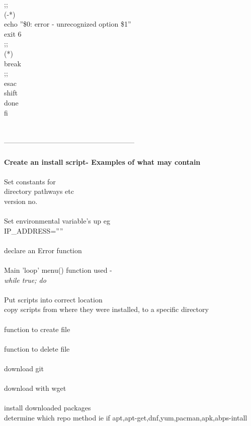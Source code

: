 \documentclass[10pt,a4paper]{article}
\begin{document}
{{{{{{{{{{{{{{{{{{{      ;;\\
      (-*)         \\
        echo ''\$0: error - unrecognized option \$1''\\
        exit 6\\
      ;;\\
      (*) \\
        break\\
      ;;\\
    esac\\
    shift\\
  done\\
fi\\
\\
\\
--------------------------------------------------------\\
\\
\textbf{Create an install script}\textbf{- Examples of what may contain}\\
\\
Set constants for \\
	directory pathways etc\\
	version no.\\
	\\
Set environmental variable's up eg\\
	IP\_ADDRESS=''''\\
\\
declare an Error function\\
\\
Main 'loop' menu() function used - \\
	\textit{while true; do}\\
\\
Put scripts into correct location\\
copy scripts from where they were installed, to a specific directory\\
\\
function to create file\\
\\
function to delete file\\
\\
download  git\\
\\
download with wget\\
\\
install downloaded packages\\
	determine which repo method ie if apt,apt-get,dnf,yum,pacman,apk,abps-intall\\
}}}}}}}}}}}}}}}}}}}
\end{document}
